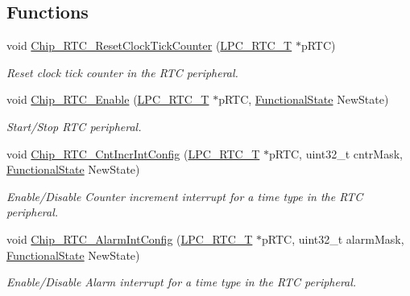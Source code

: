 \subsection*{Functions}
\begin{DoxyCompactItemize}
\item 
void \hyperlink{group___r_t_c__17_x_x__40_x_x_ga1d569e8d5d570f6c79d2d1f803bb5f7c}{Chip\+\_\+\+R\+T\+C\+\_\+\+Reset\+Clock\+Tick\+Counter} (\hyperlink{struct_l_p_c___r_t_c___t}{L\+P\+C\+\_\+\+R\+T\+C\+\_\+\+T} $\ast$p\+R\+T\+C)
\begin{DoxyCompactList}\small\item\em Reset clock tick counter in the R\+T\+C peripheral. \end{DoxyCompactList}\item 
void \hyperlink{group___r_t_c__17_x_x__40_x_x_gaad05032c6d6c4bc5ea9e02311cdc9a18}{Chip\+\_\+\+R\+T\+C\+\_\+\+Enable} (\hyperlink{struct_l_p_c___r_t_c___t}{L\+P\+C\+\_\+\+R\+T\+C\+\_\+\+T} $\ast$p\+R\+T\+C, \hyperlink{group___l_p_c___types___public___types_gac9a7e9a35d2513ec15c3b537aaa4fba1}{Functional\+State} New\+State)
\begin{DoxyCompactList}\small\item\em Start/\+Stop R\+T\+C peripheral. \end{DoxyCompactList}\item 
void \hyperlink{group___r_t_c__17_x_x__40_x_x_gaddaf7559a23df0704358128234fcb214}{Chip\+\_\+\+R\+T\+C\+\_\+\+Cnt\+Incr\+Int\+Config} (\hyperlink{struct_l_p_c___r_t_c___t}{L\+P\+C\+\_\+\+R\+T\+C\+\_\+\+T} $\ast$p\+R\+T\+C, uint32\+\_\+t cntr\+Mask, \hyperlink{group___l_p_c___types___public___types_gac9a7e9a35d2513ec15c3b537aaa4fba1}{Functional\+State} New\+State)
\begin{DoxyCompactList}\small\item\em Enable/\+Disable Counter increment interrupt for a time type in the R\+T\+C peripheral. \end{DoxyCompactList}\item 
void \hyperlink{group___r_t_c__17_x_x__40_x_x_ga2ecd6a555d1a1977a80a30ca21645ca4}{Chip\+\_\+\+R\+T\+C\+\_\+\+Alarm\+Int\+Config} (\hyperlink{struct_l_p_c___r_t_c___t}{L\+P\+C\+\_\+\+R\+T\+C\+\_\+\+T} $\ast$p\+R\+T\+C, uint32\+\_\+t alarm\+Mask, \hyperlink{group___l_p_c___types___public___types_gac9a7e9a35d2513ec15c3b537aaa4fba1}{Functional\+State} New\+State)
\begin{DoxyCompactList}\small\item\em Enable/\+Disable Alarm interrupt for a time type in the R\+T\+C peripheral. \end{DoxyCompactList}\item 

\end{DoxyCompactItemize}
